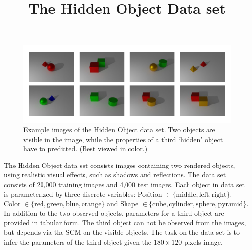 \documentclass{article}
\title{The Hidden Object Data set}
\author{}
\date{} %
\begin{document}
\maketitle

\begin{figure}[h!]
\centering
\includegraphics[width=\linewidth]{figure_hiddenObject.pdf}
\caption{Example images of the Hidden Object data set. Two objects are visible in the image, while the properties of a third `hidden' object have to predicted. (Best viewed in color.)}
\label{fig:HOsamples}
\end{figure}


The Hidden Object data set consists images containing two rendered objects, using realistic visual effects, such as shadows and reflections. The data set consists of 20,000 training images and 4,000 test images. Each object in data set is parameterized by three discrete variables: Position $\in \{ \text{middle}, \text{left}, \text{right} \}$, Color $\in \{ \text{red}, \text{green}, \text{blue}, \text{orange} \}$ and Shape $\in \{ \text{cube}, \text{cylinder}, \text{sphere}, \text{pyramid} \}$. In addition to the two observed objects, parameters for a third object are provided in tabular form. The third object can not be observed from the images, but depends via the SCM on the visible objects. The task on the data set is to infer the parameters of the third object given the $180 \times 120$ pixels image.
\end{document}
